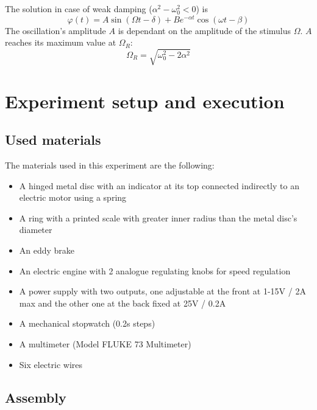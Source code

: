 \documentclass{scrreprt}
\renewcommand{\phi}{\varphi}
\begin{document}
The solution in case of weak damping ($\alpha^2 - \omega_0^2 < 0$) is
\begin{equation}
\phi(t) = A \sin{(\Omega t - \delta)} + B e^{-\alpha t} \cos{(\omega t - \beta)} \label{eq:forceddampedsolution}
\end{equation}
The oscillation's amplitude $A$ is dependant on the amplitude of the stimulus $\Omega$. $A$ reaches its maximum value at $\Omega_R$:
\begin{equation}
\Omega_R = \sqrt{\omega_0^2-2\alpha^2}
\end{equation}

\section{Experiment setup and execution}
\subsection{Used materials}
The materials used in this experiment are the following:
\begin{itemize}
\item A hinged metal disc with an indicator at its top connected indirectly to an electric motor using a spring
\item A ring with a printed scale with greater inner radius than the metal disc's diameter
\item An eddy brake
\item An electric engine with 2 analogue regulating knobs for speed regulation
\item A power supply with two outputs, one adjustable at the front at 1-15V / 2A max and the other one at the back fixed at 25V / 0.2A
\item A mechanical stopwatch (0.2s steps)
\item A multimeter (Model FLUKE 73 Multimeter)
\item Six electric wires
\end{itemize}

\subsection{Assembly}
\end{document}
